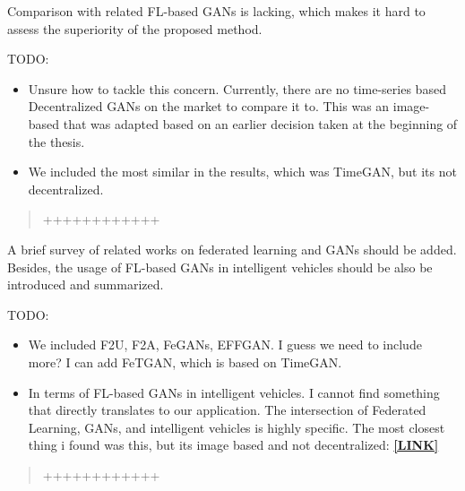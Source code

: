 \documentclass{article}
\begin{document}
\RC Comparison with related FL-based GANs is lacking, which makes it hard to assess the superiority of the proposed method.

\AR TODO: 
\begin{itemize}
    \item Unsure how to tackle this concern. Currently, there are no time-series based Decentralized GANs on the market to compare it to. This was an image-based that was adapted based on an earlier decision taken at the beginning of the thesis.
    \item We included the most similar in the results, which was TimeGAN, but its not decentralized.
\end{itemize}

\begin{quote}
	++++++++++++
\end{quote}

\RC A brief survey of related works on federated learning and GANs should be added. Besides, the usage of FL-based GANs in intelligent vehicles should be also be introduced and summarized.

\AR TODO: 
\begin{itemize}
    \item We included F2U, F2A, FeGANs, EFFGAN. I guess we need to include more? I can add FeTGAN, which is based on TimeGAN.
    \item In terms of FL-based GANs in intelligent vehicles. I cannot find something that directly translates to our application. The intersection of Federated Learning, GANs, and intelligent vehicles is highly specific. The most closest thing i found was this, but its image based and not decentralized: \href{https://openaccess.thecvf.com/content/WACV2021W/AVV/papers/Xu_Reliability_of_GAN_Generated_Data_to_Train_and_Validate_Perception_WACVW_2021_paper.pdf}{\textbf{[LINK]}}
\end{itemize}

\begin{quote}
	++++++++++++
\end{quote}
\end{document}
